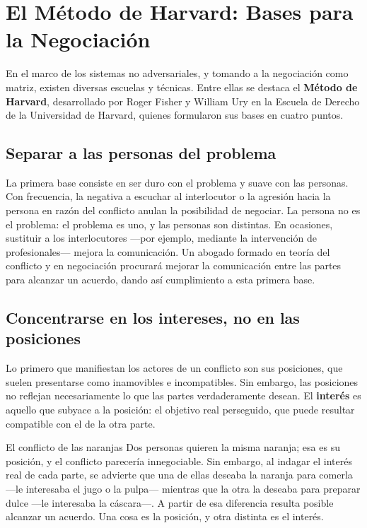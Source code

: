 \documentclass[12pt,oneside]{book}
\begin{document}
\chapter{El Método de Harvard: Bases para la Negociación}

En el marco de los sistemas no adversariales, y tomando a la negociación como matriz, existen diversas escuelas y técnicas. Entre ellas se destaca el \textbf{Método de Harvard}, desarrollado por Roger Fisher y William Ury en la Escuela de Derecho de la Universidad de Harvard, quienes formularon sus bases en cuatro puntos.

\section{Separar a las personas del problema}

La primera base consiste en ser duro con el problema y suave con las personas. Con frecuencia, la negativa a escuchar al interlocutor o la agresión hacia la persona en razón del conflicto anulan la posibilidad de negociar. La persona no es el problema: el problema es uno, y las personas son distintas. En ocasiones, sustituir a los interlocutores ---por ejemplo, mediante la intervención de profesionales--- mejora la comunicación. Un abogado formado en teoría del conflicto y en negociación procurará mejorar la comunicación entre las partes para alcanzar un acuerdo, dando así cumplimiento a esta primera base.

\section{Concentrarse en los intereses, no en las posiciones}

Lo primero que manifiestan los actores de un conflicto son sus posiciones, que suelen presentarse como inamovibles e incompatibles. Sin embargo, las posiciones no reflejan necesariamente lo que las partes verdaderamente desean. El \textbf{interés} es aquello que subyace a la posición: el objetivo real perseguido, que puede resultar compatible con el de la otra parte.

\begin{example}{El conflicto de las naranjas}
Dos personas quieren la misma naranja; esa es su posición, y el conflicto parecería innegociable. Sin embargo, al indagar el interés real de cada parte, se advierte que una de ellas deseaba la naranja para comerla ---le interesaba el jugo o la pulpa--- mientras que la otra la deseaba para preparar dulce ---le interesaba la cáscara---. A partir de esa diferencia resulta posible alcanzar un acuerdo. Una cosa es la posición, y otra distinta es el interés.
\end{example}
\end{document}
